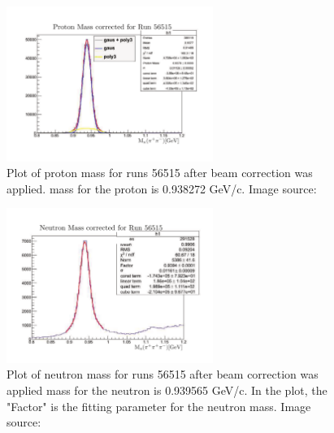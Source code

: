 \begin{figure}\begin{center}
\includegraphics[width=0.6\textwidth]{figures/calib/tag/ecor/FixedmisssingmassII.pdf}
\caption[Proton Mass for Run 56515 After Beam Correction]{\label{fig:proton.fix} Plot of proton mass for runs 56515 after beam correction was applied.   mass for the proton is 0.938272 GeV/c. Image source:~\cite{clas.thesis.kunkel}}
\end{center}\end{figure}

\begin{figure}\begin{center}
\includegraphics[width=0.6\textwidth]{figures/calib/tag/ecor/FixedmisssingmassneutronII.pdf}
\caption[Neutron Mass for Run 56515 After Beam Correction]{\label{fig:neutron.fix} Plot of neutron mass for runs 56515 after beam correction was applied   mass for the neutron is 0.939565 GeV/c. In the plot, the "Factor" is the fitting parameter for the neutron mass. Image source:~\cite{clas.thesis.kunkel}}
\end{center}\end{figure}

